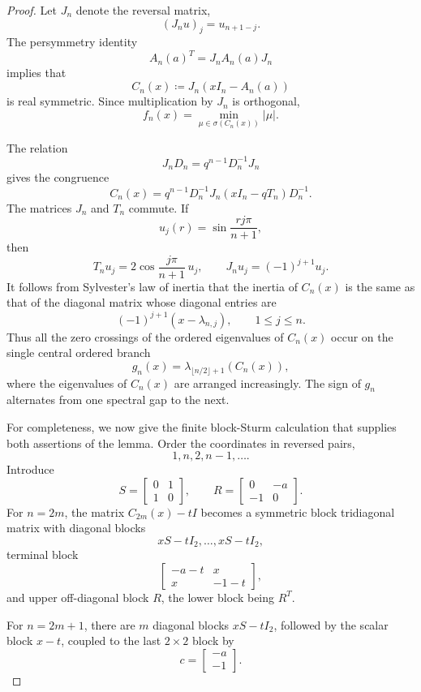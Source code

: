 \documentclass[11pt]{article}
\begin{document}
\begin{proof}
Let \(J_n\) denote the reversal matrix,
\[
(J_nu)_j=u_{n+1-j}.
\]
The persymmetry identity
\[
A_n(a)^T=J_nA_n(a)J_n
\]
implies that
\[
C_n(x)\coloneqq J_n(xI_n-A_n(a))
\]
is real symmetric. Since multiplication by \(J_n\) is orthogonal,
\[
f_n(x)=\min_{\mu\in\sigma(C_n(x))}|\mu|.
\]

The relation
\[
J_nD_n=q^{n-1}D_n^{-1}J_n
\]
gives the congruence
\[
C_n(x)
=
q^{n-1}D_n^{-1}J_n(xI_n-qT_n)D_n^{-1}.
\]
The matrices \(J_n\) and \(T_n\) commute. If
\[
u_j(r)=\sin\frac{rj\pi}{n+1},
\]
then
\[
T_nu_j=2\cos\frac{j\pi}{n+1}\,u_j,
\qquad
J_nu_j=(-1)^{j+1}u_j.
\]
It follows from Sylvester's law of inertia that the inertia of \(C_n(x)\) is the same as that of the diagonal matrix whose diagonal entries are
\[
(-1)^{j+1}(x-\lambda_{n,j}),\qquad 1\le j\le n.
\]
Thus all the zero crossings of the ordered eigenvalues of \(C_n(x)\) occur on the single central ordered branch
\[
g_n(x)
=
\lambda_{\lfloor n/2\rfloor+1}(C_n(x)),
\]
where the eigenvalues of \(C_n(x)\) are arranged increasingly. The sign of \(g_n\) alternates from one spectral gap to the next.

For completeness, we now give the finite block-Sturm calculation that supplies both assertions of the lemma. Order the coordinates in reversed pairs,
\[
1,n,2,n-1,\ldots.
\]
Introduce
\[
S=
\begin{bmatrix}
0&1\\
1&0
\end{bmatrix},
\qquad
R=
\begin{bmatrix}
0&-a\\
-1&0
\end{bmatrix}.
\]
For \(n=2m\), the matrix \(C_{2m}(x)-tI\) becomes a symmetric block tridiagonal matrix with diagonal blocks
\[
xS-tI_2,\ldots,xS-tI_2,
\]
terminal block
\[
\begin{bmatrix}
-a-t&x\\
x&-1-t
\end{bmatrix},
\]
and upper off-diagonal block \(R\), the lower block being \(R^T\).

For \(n=2m+1\), there are \(m\) diagonal blocks \(xS-tI_2\), followed by the scalar block \(x-t\), coupled to the last \(2\times2\) block by
\[
c=
\begin{bmatrix}
-a\\
-1
\end{bmatrix}.
\]


\end{proof}
\end{document}
